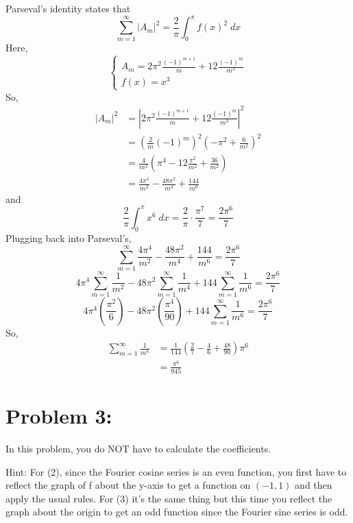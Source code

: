 \documentclass[12pt]{article}
\begin{document}
\begin{enumerate}
    \color{blue}
    Parseval's identity states that 
    \[\sum_{m=1}^\infty |A_m|^2 = \frac{2}{\pi} \int_0^\pi f(x)^2 \; dx\]
    Here, 
    \[\begin{cases}
        A_m = 2\pi^2 \frac{(-1)^{m+1}}{m} + 12\frac{(-1)^m}{m^3}\\
        f(x) = x^3
    \end{cases}\]
    So, 
    \begin{align*}
        |A_m|^2 &= \left| 2\pi^2 \frac{(-1)^{m+1}}{m} + 12\frac{(-1)^m}{m^3}\right|^2 \\
        &= (\frac{2}{m}(-1)^m)^2(-\pi^2 + \frac{6}{m^2})^2\\
        &= \frac{4}{m^2}(\pi^4 - 12\frac{\pi^2}{m^2} + \frac{36}{m^2})\\
        &= \frac{4\pi^4}{m^2} - \frac{48\pi^2}{m^4} + \frac{144}{m^6}
    \end{align*}    and 
    \[\frac{2}{\pi}\int_0^\pi x^6 \; dx = \frac{2}{\pi} \cdot \frac{\pi^7}{7} = \frac{2\pi^6}{7}\]
    Plugging back into Parseval's, 
    \[\sum_{m=1}^\infty \frac{4\pi^4}{m^2} - \frac{48\pi^2}{m^4} + \frac{144}{m^6} = \frac{2\pi^6}{7}\]
    \[4\pi^4 \sum_{m=1}^\infty \frac{1}{m^2} - 48\pi^2\sum_{m=1}^\infty \frac{1}{m^4} + 144\sum_{m=1}^\infty \frac{1}{m^6} = \frac{2\pi^6}{7}\]
    \[4\pi^4(\frac{\pi^2}{6}) - 48\pi^2 (\frac{\pi^4}{90}) + 144\sum_{m=1}^\infty \frac{1}{m^6} = \frac{2\pi^6}{7}\]
    So,
    \begin{align*}
        \sum_{m=1}^\infty \frac{1}{m^6} &= \frac{1}{144}\left(\frac{2}{7} - \frac{4}{6} + \frac{48}{90}\right)\pi^6\\
        &= \boxed{\frac{\pi^6}{945}}
    \end{align*}
\end{enumerate}

\pagebreak 
\section*{Problem 3:}
In this problem, you do NOT have to calculate the coefficients.

Hint: For (2), since the Fourier cosine series is an even function, you first have to reflect the graph of f about the y-axis to get a function on $(-1, 1)$ and then apply the usual rules. For (3) it's the same thing but this time you reflect the graph about the origin to get an odd function since the Fourier sine series is odd.
\end{document}
